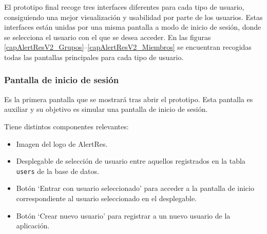 
     El prototipo final recoge tres interfaces diferentes para cada tipo de usuario, consiguiendo una mejor visualización y usabilidad por parte de los usuarios. Estas interfaces están unidas por una misma pantalla a modo de inicio de sesión, donde se selecciona el usuario con el que se desea acceder. En las figuras \ref{capAlertResV2_Grupos}--\ref{capAlertResV2_Miembros} se encuentran recogidas todas las pantallas principales para cada tipo de usuario.
     
     



\clearpage
     \subsubsection{Pantalla de inicio de sesión}
     Es la primera pantalla que se mostrará tras abrir el prototipo. Esta pantalla es auxiliar y su objetivo es simular una pantalla de inicio de sesión.

     Tiene distintos componentes relevantes:
     \begin{itemize}
         \item Imagen del logo de AlertRes.
         \item Desplegable de selección de usuario entre aquellos registrados en la tabla \texttt{users} de la base de datos.
         \item Botón `Entrar con usuario seleccionado' para acceder a la pantalla de inicio correspondiente al usuario seleccionado en el desplegable.
         \item Botón `Crear nuevo usuario' para registrar a un nuevo usuario de la aplicación.
         
     \end{itemize}

